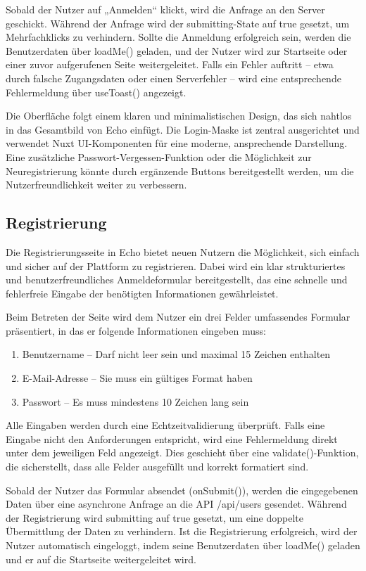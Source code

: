 \documentclass[a4paper,12pt]{article}
\begin{document}
Sobald der Nutzer auf „Anmelden“ klickt, wird die Anfrage an den
Server geschickt. Während der Anfrage wird der submitting-State auf true
gesetzt, um Mehrfachklicks zu verhindern. Sollte die Anmeldung erfolgreich
sein, werden die Benutzerdaten über loadMe() geladen, und der Nutzer wird zur
Startseite oder einer zuvor aufgerufenen Seite weitergeleitet. Falls ein Fehler
auftritt – etwa durch falsche Zugangsdaten oder einen Serverfehler – wird eine
entsprechende Fehlermeldung über useToast() angezeigt.

Die Oberfläche folgt einem klaren und minimalistischen Design, das sich nahtlos
in das Gesamtbild von Echo einfügt. Die Login-Maske ist zentral ausgerichtet
und verwendet Nuxt UI-Komponenten für eine moderne, ansprechende Darstellung.
Eine zusätzliche Passwort-Vergessen-Funktion oder die Möglichkeit zur
Neuregistrierung könnte durch ergänzende Buttons bereitgestellt werden, um die
Nutzerfreundlichkeit weiter zu verbessern.

\subsection{Registrierung}
Die Registrierungsseite in Echo bietet neuen Nutzern die Möglichkeit, sich
einfach und sicher auf der Plattform zu registrieren. Dabei wird ein klar
strukturiertes und benutzerfreundliches Anmeldeformular bereitgestellt, das
eine schnelle und fehlerfreie Eingabe der benötigten Informationen
gewährleistet.

Beim Betreten der Seite wird dem Nutzer ein drei Felder umfassendes Formular
präsentiert, in das er folgende Informationen eingeben muss:

\begin{enumerate}
    \item Benutzername – Darf nicht leer sein und maximal 15 Zeichen enthalten
    \item E-Mail-Adresse – Sie muss ein gültiges Format haben
    \item Passwort – Es muss mindestens 10 Zeichen lang sein
\end{enumerate}

Alle Eingaben werden durch eine Echtzeitvalidierung überprüft. Falls eine Eingabe
nicht den Anforderungen entspricht, wird eine Fehlermeldung direkt unter dem
jeweiligen Feld angezeigt. Dies geschieht über eine validate()-Funktion, die
sicherstellt, dass alle Felder ausgefüllt und korrekt formatiert sind.

Sobald der Nutzer das Formular absendet (onSubmit()), werden die eingegebenen
Daten über eine asynchrone Anfrage an die API /api/users gesendet. Während der
Registrierung wird submitting auf true gesetzt, um eine doppelte Übermittlung
der Daten zu verhindern. Ist die Registrierung erfolgreich, wird der Nutzer
automatisch eingeloggt, indem seine Benutzerdaten über loadMe() geladen und er
auf die Startseite weitergeleitet wird.
\end{document}

